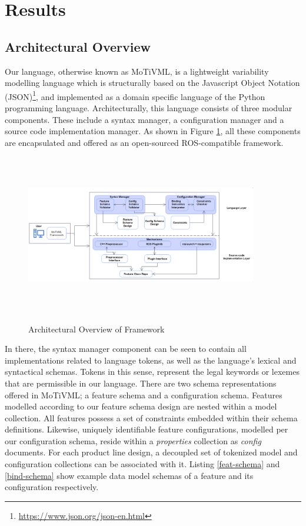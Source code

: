 \documentclass[conference]{IEEEtran}
\newcommand{\foot}[1]{\footnote{\url{#1}}}
\begin{document}
\section{Results}
\subsection{Architectural Overview}
Our language, otherwise known as MoTiVML, is a lightweight variability modelling language which is structurally based on the Javascript Object Notation (JSON)\foot{https://www.json.org/json-en.html}, and implemented as a domain specific language of the Python programming language. Architecturally, this language consists of three modular components. These include a syntax manager, a configuration manager and a source code implementation manager. As shown in Figure \ref{arch-over}, all these components are encapsulated and offered as an open-sourced ROS-compatible framework.

\begin{figure}[h]
	\caption{Architectural Overview of Framework}
	\centering
	\includegraphics[width=0.9\textwidth,height=7cm]{diagrams/arch-over-new.png}
	\label{arch-over}
\end{figure}

In there, the syntax manager component can be seen to contain all implementations related to language tokens, as well as the language's lexical and syntactical schemas. Tokens in this sense, represent the legal keywords or lexemes that are permissible in our language. There are two schema representations offered in MoTiVML; a feature schema and a configuration schema. Features modelled according to our feature schema design are nested within a model collection. All features possess a set of constraints embedded within their schema definitions. Likewise, uniquely identifiable feature configurations, modelled per our configuration schema, reside within a \textit{properties} collection as \textit{config} documents. For each product line design, a decoupled set of tokenized model and configuration collections can be associated with it. Listing \ref{feat-schema} and \ref{bind-schema} show example data model schemas of a feature and its configuration respectively.
\end{document}
